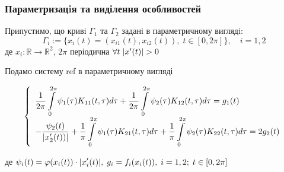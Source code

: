 \documentclass{beamer}
\numberwithin{equation}{section}
\newcommand{\intl}{\int\limits}
\newcommand{\inttwopi}{\intl_{0}^{2\pi}}
\begin{document}
	\begin{frame}
		\frametitle{Параметризацiя та виділення особливостей}
		Припустимо, що кривi $\Gamma_{1}$ та $\Gamma_{2}$ заданi в параметричному виглядi:
		\begin{equation}
			\Gamma_{i} := \{ x_{i}(t) = (x_{i1}(t), x_{i2}(t)), \; t \in [ 0, 2\pi ] \} , \quad i = 1, 2
		\end{equation}
		\indent де $x_{i} : \mathbb{R} \rightarrow \mathbb{R}^2$, $2\pi$ періодична $\forall{t} \; \abs{x'(t)} > 0$ 
		
		Подамо систему ref в параметричному вигляді
		\begin{small}
			\begin{equation}
				\label{IE-parametrized-system}
				\left\{
				\begin{array}{l}
					\displaystyle
					\frac{1}{2\pi} \inttwopi \psi_1(\tau) K_{11}(t, \tau) d \tau
					+ \frac{1}{2\pi} \inttwopi  \psi_2(\tau) K_{12}(t, \tau) d \tau
					= g_{1}(t)
					\\ [0.3cm]
					\displaystyle
					- \frac{\psi_2(t)}{\abs{x'_{2}(t))}}
					+ \frac{1}{\pi} \inttwopi \psi_1(\tau) K_{21}(t, \tau) d \tau
					+ \frac{1}{\pi} \inttwopi  \psi_2(\tau) K_{22}(t, \tau) d \tau
					= 2g_{2}(t)
				\end{array}\right.
			\end{equation}
		
		де $\displaystyle \psi_{i}(t) = \varphi(x_{i}(t)) \cdot \abs{x'_{i}(t)}, \; g_{i} = f_{i}(x_{i}(t)), \;  i  = 1, 2; \; t \in [0, 2\pi]$ \\[0.3cm]
		
		\end{small}
	\end{frame}
	
		
\end{document}
